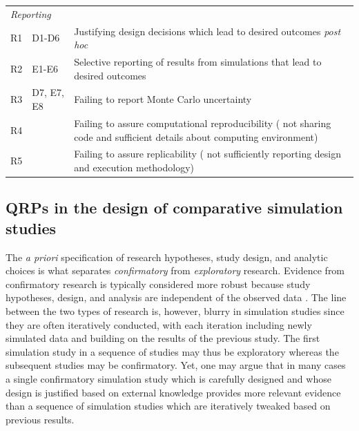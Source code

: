 \documentclass[a4paper, 11pt]{article}
\begin{document}
\begin{table}[!htb]
\begin{tabular}{p{} p{} p{}}
    \multicolumn{2}{p{.15\textwidth}}{\textit{Reporting}} & \\
    R1 & D1-D6 & Justifying design decisions which lead
    to desired outcomes \emph{post hoc}\\
    R2 & E1-E6 & Selective reporting of results from simulations
           that lead to desired outcomes \\
    R3 & D7, E7, E8 & Failing to report Monte Carlo uncertainty \\
    R4 & & Failing to assure computational reproducibility 
    (\eg{} not sharing code and sufficient
           details about computing environment) \\
    R5 & & Failing to assure replicability (\eg{} not sufficiently reporting design and
           execution methodology) \\
		\bottomrule	
	\end{tabular}
\end{table}

\subsection{QRPs in the design of comparative simulation studies}
The \emph{a priori} specification of research hypotheses, study design, and
analytic choices is what separates \emph{confirmatory} from
\emph{exploratory} research. Evidence from confirmatory
research is typically considered more robust because study hypotheses, design,
and analysis are independent of the observed data \citep{Tukey1980}. 
The line between the two types of research is, however, blurry in 
simulation studies since they are often iteratively conducted, with each iteration
including newly simulated data and building on the results of the previous study.
The first simulation study in a sequence of studies may thus be
exploratory whereas the subsequent studies may be confirmatory.
Yet, one may argue that in many cases a single confirmatory simulation study
which is carefully designed and whose design is justified based on 
external knowledge provides more relevant evidence than a sequence of
simulation studies which are iteratively tweaked based on previous
results. 
\end{document}
